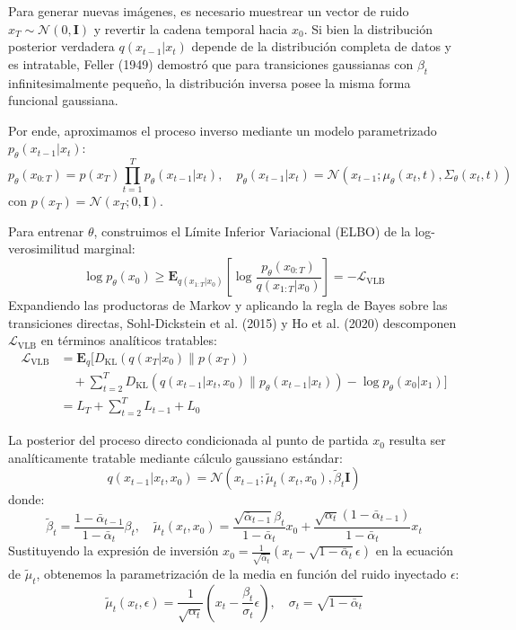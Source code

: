Para generar nuevas imágenes, es necesario muestrear un vector de ruido $x_T \sim \mathcal{N}(0, \mathbf{I})$ y revertir la cadena temporal hacia $x_0$. Si bien la distribución posterior verdadera $q(x_{t-1}|x_t)$ depende de la distribución completa de datos y es intratable, Feller (1949) demostró que para transiciones gaussianas con $\beta_t$ infinitesimalmente pequeño, la distribución inversa posee la misma forma funcional gaussiana.

Por ende, aproximamos el proceso inverso mediante un modelo parametrizado $p_\theta(x_{t-1}|x_t)$:
\begin{equation}
p_\theta(x_{0:T}) = p(x_T) \prod_{t=1}^T p_\theta(x_{t-1}|x_t), \quad p_\theta(x_{t-1}|x_t) = \mathcal{N}(x_{t-1}; \mu_\theta(x_t, t), \Sigma_\theta(x_t, t))
\end{equation}
con $p(x_T) = \mathcal{N}(x_T; 0, \mathbf{I})$.

Para entrenar $\theta$, construimos el Límite Inferior Variacional (ELBO) de la log-verosimilitud marginal:
\begin{equation}
\log p_\theta(x_0) \ge \mathbf{E}_{q(x_{1:T}|x_0)} \left[ \log \frac{p_\theta(x_{0:T})}{q(x_{1:T}|x_0)} \right] = - \mathcal{L}_{\mathrm{VLB}}
\end{equation}
Expandiendo las productoras de Markov y aplicando la regla de Bayes sobre las transiciones directas, Sohl-Dickstein et al. (2015) y Ho et al. (2020) descomponen $\mathcal{L}_{\mathrm{VLB}}$ en términos analíticos tratables:
\begin{align}
\mathcal{L}_{\mathrm{VLB}} &= \mathbf{E}_q \Big[ D_{\mathrm{KL}}(q(x_T|x_0) \parallel p(x_T)) \nonumber \\
&\quad + \sum_{t=2}^T D_{\mathrm{KL}}(q(x_{t-1}|x_t, x_0) \parallel p_\theta(x_{t-1}|x_t)) - \log p_\theta(x_0|x_1) \Big] \nonumber \\
&= L_T + \sum_{t=2}^T L_{t-1} + L_0
\end{align}

La posterior del proceso directo condicionada al punto de partida $x_0$ resulta ser analíticamente tratable mediante cálculo gaussiano estándar:
\begin{equation}
q(x_{t-1}|x_t, x_0) = \mathcal{N}(x_{t-1}; \tilde{\mu}_t(x_t, x_0), \tilde{\beta}_t \mathbf{I})
\end{equation}
donde:
\begin{equation}
\tilde{\beta}_t = \frac{1 - \bar{\alpha}_{t-1}}{1 - \bar{\alpha}_t} \beta_t, \quad \tilde{\mu}_t(x_t, x_0) = \frac{\sqrt{\bar{\alpha}_{t-1}} \beta_t}{1 - \bar{\alpha}_t} x_0 + \frac{\sqrt{\alpha_t}(1 - \bar{\alpha}_{t-1})}{1 - \bar{\alpha}_t} x_t
\end{equation}
Sustituyendo la expresión de inversión $x_0 = \frac{1}{\sqrt{\bar{\alpha}_t}} \left( x_t - \sqrt{1 - \bar{\alpha}_t} \epsilon \right)$ en la ecuación de $\tilde{\mu}_t$, obtenemos la parametrización de la media en función del ruido inyectado $\epsilon$:
\begin{equation}
\tilde{\mu}_t(x_t, \epsilon) = \frac{1}{\sqrt{\alpha_t}} \left( x_t - \frac{\beta_t}{\sigma_t} \epsilon \right), \quad \sigma_t = \sqrt{1 - \bar{\alpha}_t}
\end{equation}


